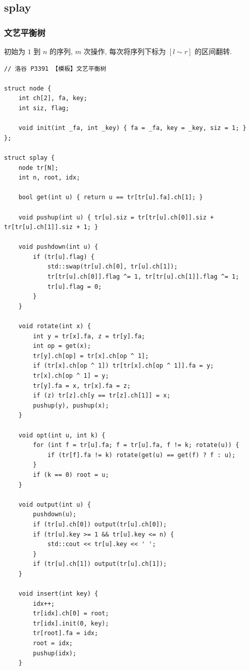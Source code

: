 \documentclass[UTF8, a4paper, titlepage, twoside]{ctexart}
\begin{document}
\subsection{ splay }

\subsubsection*{ 文艺平衡树 }

初始为 $1$ 到 $n$ 的序列, $m$ 次操作, 每次将序列下标为 $[l \sim r]$ 的区间翻转.

\begin{lstlisting}[style=cpp]
// 洛谷 P3391 【模板】文艺平衡树

struct node {
    int ch[2], fa, key;
    int siz, flag;

    void init(int _fa, int _key) { fa = _fa, key = _key, siz = 1; }
};

struct splay {
    node tr[N];
    int n, root, idx;

    bool get(int u) { return u == tr[tr[u].fa].ch[1]; }

    void pushup(int u) { tr[u].siz = tr[tr[u].ch[0]].siz + tr[tr[u].ch[1]].siz + 1; }

    void pushdown(int u) {
        if (tr[u].flag) {
            std::swap(tr[u].ch[0], tr[u].ch[1]);
            tr[tr[u].ch[0]].flag ^= 1, tr[tr[u].ch[1]].flag ^= 1;
            tr[u].flag = 0;
        }
    }

    void rotate(int x) {
        int y = tr[x].fa, z = tr[y].fa;
        int op = get(x);
        tr[y].ch[op] = tr[x].ch[op ^ 1];
        if (tr[x].ch[op ^ 1]) tr[tr[x].ch[op ^ 1]].fa = y;
        tr[x].ch[op ^ 1] = y;
        tr[y].fa = x, tr[x].fa = z;
        if (z) tr[z].ch[y == tr[z].ch[1]] = x;
        pushup(y), pushup(x);
    }

    void opt(int u, int k) {
        for (int f = tr[u].fa; f = tr[u].fa, f != k; rotate(u)) {
            if (tr[f].fa != k) rotate(get(u) == get(f) ? f : u);
        }
        if (k == 0) root = u;
    }

    void output(int u) {
        pushdown(u);
        if (tr[u].ch[0]) output(tr[u].ch[0]);
        if (tr[u].key >= 1 && tr[u].key <= n) {
            std::cout << tr[u].key << ' ';
        }
        if (tr[u].ch[1]) output(tr[u].ch[1]);
    }

    void insert(int key) {
        idx++;
        tr[idx].ch[0] = root;
        tr[idx].init(0, key);
        tr[root].fa = idx;
        root = idx;
        pushup(idx);
    }


\end{lstlisting}
\end{document}
